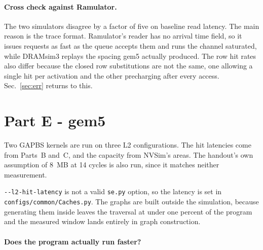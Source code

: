 \documentclass[9pt,a4paper]{extarticle}
\begin{document}
\paragraph{Cross check against Ramulator.}

The two simulators disagree by a factor of five on baseline read latency.
The main reason is the trace format. Ramulator's reader has no arrival
time field, so it issues requests as fast as the queue accepts them and
runs the channel saturated, while DRAMsim3 replays the spacing gem5
actually produced. The row hit rates also differ because the closed row
substitutions are not the same, one allowing a single hit per activation
and the other precharging after every access. Sec.~\ref{sec:err} returns
to this.









\section{Part E - gem5}
\label{sec:e}

Two GAPBS kernels are run on three L2 configurations. The hit latencies
come from Parts~B and~C, and the capacity from NVSim's areas. The
handout's own assumption of \SI{8}{MB} at 14 cycles is also run, since it
matches neither measurement.

\texttt{-{}-l2-hit-latency} is not a valid \texttt{se.py} option, so the
latency is set in \texttt{configs/common/Caches.py}. The graphs are built
outside the simulation, because generating them inside leaves the
traversal at under one percent of the program and the measured window
lands entirely in graph construction.

\paragraph{Does the program actually run faster?}
\end{document}
